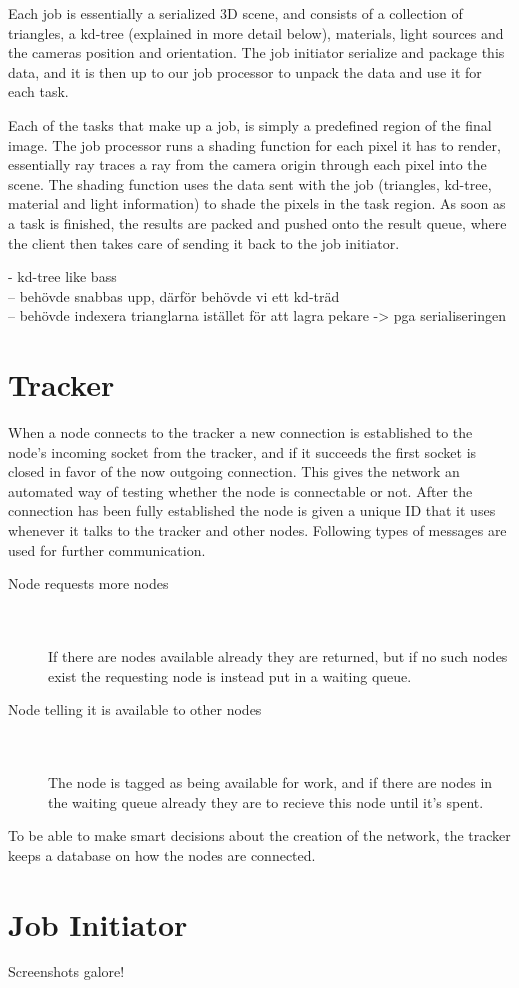 Each job is essentially a serialized 3D scene, and consists of a collection of triangles, a kd-tree (explained in more detail below), materials, light sources and the cameras position and orientation. The job initiator serialize and package this data, and it is then up to our job processor to unpack the data and use it for each task.

Each of the tasks that make up a job, is simply a predefined region of the final image. The job processor runs a shading function for each pixel it has to render, essentially ray traces a ray from the camera origin through each pixel into the scene. The shading function uses the data sent with the job (triangles, kd-tree, material and light information) to shade the pixels in the task region. As soon as a task is finished, the results are packed and pushed onto the result queue, where the client then takes care of sending it back to the job initiator.

- kd-tree like bass\\
  -- behövde snabbas upp, därför behövde vi ett kd-träd\\
  -- behövde indexera trianglarna istället för att lagra pekare -> pga serialiseringen\\
  
  

\section{Tracker}
When a node connects to the tracker a new connection is established to the node's incoming socket from the tracker, and if it succeeds the first socket is closed in favor of the now outgoing connection.
This gives the network an automated way of testing whether the node is connectable or not.
After the connection has been fully established the node is given a unique ID that it uses whenever it talks to the tracker and other nodes.
Following types of messages are used for further communication.

\begin{description}
\item[Node requests more nodes] \hfill \\\\
If there are nodes available already they are returned, but if no such nodes exist the requesting node is instead put in a waiting queue.
\item[Node telling it is available to other nodes] \hfill \\\\
The node is tagged as being available for work, and if there are nodes in the waiting queue already they are to recieve this node until it's spent.
\end{description}

To be able to make smart decisions about the creation of the network, the tracker keeps a database on how the nodes are connected.

\section{Job Initiator}
Screenshots galore!
